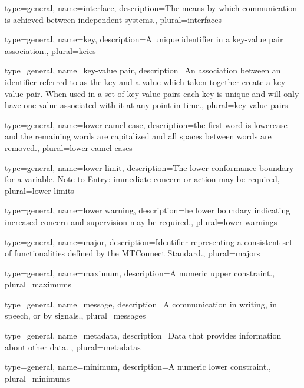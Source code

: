 {
	type={general},
    name={interface},
	description={The means by which communication is achieved between independent systems.},
	plural={interfaces}
}

{
	type={general},
    name={key},
	description={A unique identifier in a \gls{key-value pair} association.},
	plural={keies}
}

{
	type={general},
    name={key-value pair},
	description={An association between an identifier referred to as the \gls{key} and a value which taken together create a \gls{key-value pair}. When used in a set of \glspl{key-value pair} each \gls{key} is unique and will only have one value associated with it at any point in time.},
	plural={key-value pairs}
}

{
	type={general},
    name={lower camel case},
	description={the first word is lowercase and the remaining words are capitalized and all spaces between words are removed.},
	plural={lower camel cases}
}

{
	type={general},
    name={lower limit},
	description={The lower conformance boundary for a variable.
Note to Entry: immediate concern or action may be required},
	plural={lower limits}
}

{
	type={general},
    name={lower warning},
	description={he lower boundary indicating increased concern and supervision may be required.},
	plural={lower warnings}
}

{
	type={general},
    name={major},
	description={Identifier representing a consistent set of functionalities defined by the MTConnect Standard.},
	plural={majors}
}

{
	type={general},
    name={maximum},
	description={A numeric upper constraint.},
	plural={maximums}
}

{
	type={general},
    name={message},
	description={A communication in writing, in speech, or by signals.},
	plural={messages}
}

{
	type={general},
    name={metadata},
	description={Data that provides information about other data.
},
	plural={metadatas}
}

{
	type={general},
    name={minimum},
	description={A numeric lower constraint.},
	plural={minimums}
}

